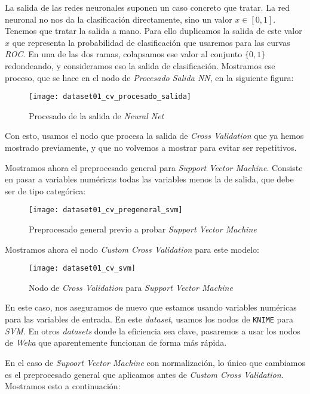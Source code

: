 \documentclass[11pt]{article}
\begin{document}
La salida de las redes neuronales suponen un caso concreto que tratar. La red neuronal no nos da la clasificación directamente, sino un valor $x \in [0, 1]$. Tenemos que tratar la salida a mano. Para ello duplicamos la salida de este valor $x$ que representa la probabilidad de clasificación que usaremos para las curvas \emph{ROC}. En una de las dos ramas, colapsamos ese valor al conjunto $\{0, 1 \}$ redondeando, y consideramos eso la salida de clasificación. Mostramos ese proceso, que se hace en el nodo de \emph{Procesado Salida NN}, en la siguiente figura:

\begin{figure}[H]
    \centering
    \texttt{[image: dataset01\_cv\_procesado\_salida]}
    \caption{Procesado de la salida de \emph{Neural Net}}
\end{figure}

Con esto, usamos el nodo que procesa la salida de \emph{Cross Validation} que ya hemos mostrado previamente, y que no volvemos a mostrar para evitar ser repetitivos.

Mostramos ahora el preprocesado general para \emph{Support Vector Machine}. Consiste en pasar a variables numéricas todas las variables menos la de salida, que debe ser de tipo categórica:

\begin{figure}[H]
    \centering
    \texttt{[image: dataset01\_cv\_pregeneral\_svm]}
    \caption{Preprocesado general previo a probar \emph{Support Vector Machine}}
\end{figure}

Mostramos ahora el nodo \emph{Custom Cross Validation} para este modelo:

\begin{figure}[H]
    \centering
    \texttt{[image: dataset01\_cv\_svm]}
    \caption{Nodo de \emph{Cross Validation} para \emph{Support Vector Machine}}
\end{figure}

En este caso, nos aseguramos de nuevo que estamos usando variables numéricas para las variables de entrada. En este \emph{dataset}, usamos los nodos de \lstinline{KNIME} para \emph{SVM}. En otros \emph{datasets} donde la eficiencia sea clave, pasaremos a usar los nodos de \emph{Weka} que aparentemente funcionan de forma más rápida.

En el caso de \emph{Supoort Vector Machine} con normalización, lo único que cambiamos es el preprocesado general que aplicamos antes de \emph{Custom Cross Validation}. Mostramos esto a continuación:
\end{document}
